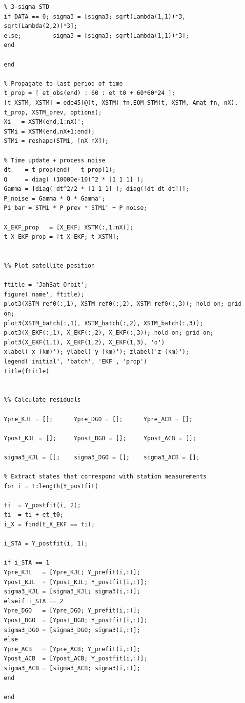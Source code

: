\documentclass[conf]{new-aiaa}
\begin{document}
\begin{lstlisting}
% 3-sigma STD 
if DATA == 0; sigma3 = [sigma3; sqrt(Lambda(1,1))*3, sqrt(Lambda(2,2))*3];  
else;         sigma3 = [sigma3; sqrt(Lambda(1,1))*3];  
end

end 

% Propagate to last period of time 
t_prop = [ et_obs(end) : 60 : et_t0 + 60*60*24 ]; 
[t_XSTM, XSTM] = ode45(@(t, XSTM) fn.EOM_STM(t, XSTM, Amat_fn, nX), t_prop, XSTM_prev, options); 
Xi   = XSTM(end,1:nX)'; 
STMi = XSTM(end,nX+1:end); 
STMi = reshape(STMi, [nX nX]); 

% Time update + process noise 
dt    = t_prop(end) - t_prop(1); 
Q     = diag( (10000e-10)^2 * [1 1 1] ); 
Gamma = [diag( dt^2/2 * [1 1 1] ); diag([dt dt dt])]; 
P_noise = Gamma * Q * Gamma'; 
Pi_bar = STMi * P_prev * STMi' + P_noise; 

X_EKF_prop   = [X_EKF; XSTM(:,1:nX)]; 
t_X_EKF_prop = [t_X_EKF; t_XSTM]; 


%% Plot satellite position 

ftitle = 'JahSat Orbit'; 
figure('name', ftitle); 
plot3(XSTM_ref0(:,1), XSTM_ref0(:,2), XSTM_ref0(:,3)); hold on; grid on; 
plot3(XSTM_batch(:,1), XSTM_batch(:,2), XSTM_batch(:,3)); 
plot3(X_EKF(:,1), X_EKF(:,2), X_EKF(:,3)); hold on; grid on; 
plot3(X_EKF(1,1), X_EKF(1,2), X_EKF(1,3), 'o')
xlabel('x (km)'); ylabel('y (km)'); zlabel('z (km)'); 
legend('initial', 'batch', 'EKF', 'prop') 
title(ftitle)


%% Calculate residuals 

Ypre_KJL = [];      Ypre_DGO = [];      Ypre_ACB = []; 

Ypost_KJL = [];     Ypost_DGO = [];     Ypost_ACB = []; 

sigma3_KJL = [];    sigma3_DGO = [];    sigma3_ACB = []; 

% Extract states that correspond with station measurements 
for i = 1:length(Y_postfit)

ti  = Y_postfit(i, 2); 
ti  = ti + et_t0; 
i_X = find(t_X_EKF == ti); 

i_STA = Y_postfit(i, 1); 

if i_STA == 1
Ypre_KJL   = [Ypre_KJL; Y_prefit(i,:)]; 
Ypost_KJL  = [Ypost_KJL; Y_postfit(i,:)]; 
sigma3_KJL = [sigma3_KJL; sigma3(i,:)]; 
elseif i_STA == 2
Ypre_DGO   = [Ypre_DGO; Y_prefit(i,:)]; 
Ypost_DGO  = [Ypost_DGO; Y_postfit(i,:)]; 
sigma3_DGO = [sigma3_DGO; sigma3(i,:)]; 
else
Ypre_ACB   = [Ypre_ACB; Y_prefit(i,:)]; 
Ypost_ACB  = [Ypost_ACB; Y_postfit(i,:)]; 
sigma3_ACB = [sigma3_ACB; sigma3(i,:)]; 
end 

end 


\end{lstlisting}
\end{document}
